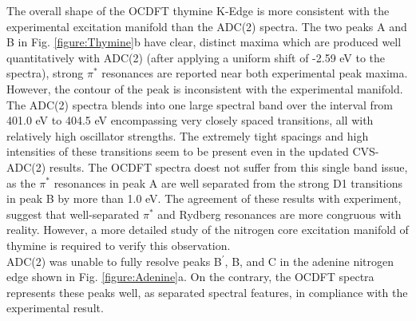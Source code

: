 \documentclass[12pt]{article}
\begin{document}
The overall shape of the OCDFT thymine K-Edge is more consistent with the experimental excitation manifold than the ADC(2) spectra. The two peaks A and B in Fig. \ref{figure:Thymine}b have clear, distinct maxima which are produced well quantitatively with ADC(2) (after applying a uniform shift of -2.59 eV to the spectra), strong $\pi^*$ resonances are reported near both experimental peak maxima. However, the contour of the peak is inconsistent with the experimental manifold. The ADC(2) spectra blends into one large spectral band over the interval from 401.0 eV to 404.5 eV encompassing very closely spaced transitions, all with relatively high oscillator strengths. The extremely tight spacings and high intensities of these transitions seem to be present even in the updated CVS-ADC(2) results. The OCDFT spectra doest not suffer from this single band issue, as the $\pi^*$ resonances in peak A are well separated from the strong D1 transitions in peak B by more than 1.0 eV. The agreement of these results with experiment, suggest that well-separated $\pi^*$ and Rydberg resonances are more congruous with reality. However, a more detailed study of the nitrogen core excitation manifold of thymine is required to verify this observation. \\
ADC(2) was unable to fully resolve peaks B$^{\prime}$, B, and C in the adenine nitrogen edge shown in Fig. \ref{figure:Adenine}a. On the contrary, the OCDFT spectra represents these peaks well, as separated spectral features, in compliance with the experimental result. 

\end{document}
